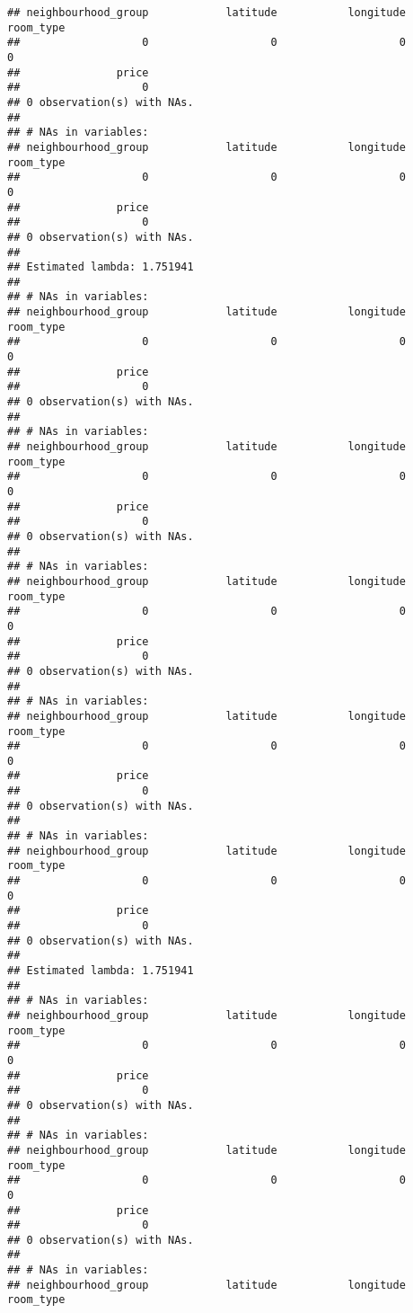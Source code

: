 \documentclass[
]{article}
\begin{document}
\begin{verbatim}
## neighbourhood_group            latitude           longitude           room_type 
##                   0                   0                   0                   0 
##               price 
##                   0 
## 0 observation(s) with NAs.
## 
## # NAs in variables:
## neighbourhood_group            latitude           longitude           room_type 
##                   0                   0                   0                   0 
##               price 
##                   0 
## 0 observation(s) with NAs.
## 
## Estimated lambda: 1.751941 
## 
## # NAs in variables:
## neighbourhood_group            latitude           longitude           room_type 
##                   0                   0                   0                   0 
##               price 
##                   0 
## 0 observation(s) with NAs.
## 
## # NAs in variables:
## neighbourhood_group            latitude           longitude           room_type 
##                   0                   0                   0                   0 
##               price 
##                   0 
## 0 observation(s) with NAs.
## 
## # NAs in variables:
## neighbourhood_group            latitude           longitude           room_type 
##                   0                   0                   0                   0 
##               price 
##                   0 
## 0 observation(s) with NAs.
## 
## # NAs in variables:
## neighbourhood_group            latitude           longitude           room_type 
##                   0                   0                   0                   0 
##               price 
##                   0 
## 0 observation(s) with NAs.
## 
## # NAs in variables:
## neighbourhood_group            latitude           longitude           room_type 
##                   0                   0                   0                   0 
##               price 
##                   0 
## 0 observation(s) with NAs.
## 
## Estimated lambda: 1.751941 
## 
## # NAs in variables:
## neighbourhood_group            latitude           longitude           room_type 
##                   0                   0                   0                   0 
##               price 
##                   0 
## 0 observation(s) with NAs.
## 
## # NAs in variables:
## neighbourhood_group            latitude           longitude           room_type 
##                   0                   0                   0                   0 
##               price 
##                   0 
## 0 observation(s) with NAs.
## 
## # NAs in variables:
## neighbourhood_group            latitude           longitude           room_type 

\end{verbatim}
\end{document}
